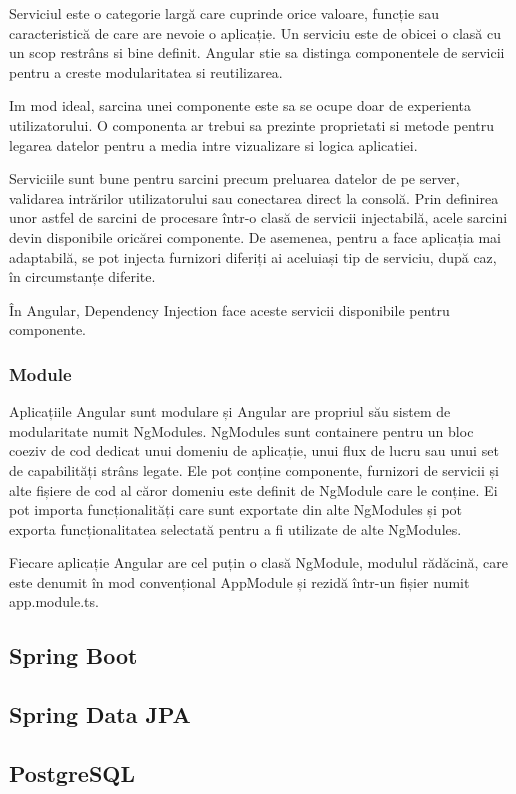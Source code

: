 \documentclass[a4paper,12pt]{article}
\begin{document}
    Serviciul este o categorie largă care cuprinde orice valoare, funcție sau caracteristică de care are nevoie o aplicație. 
    Un serviciu este de obicei o clasă cu un scop restrâns si bine definit. Angular stie sa distinga componentele de servicii pentru a creste modularitatea si reutilizarea.

    Im mod ideal, sarcina unei componente este sa se ocupe doar de experienta utilizatorului. O componenta ar trebui sa prezinte proprietati si metode
    pentru legarea datelor pentru a media intre vizualizare si logica aplicatiei.

    Serviciile sunt bune pentru sarcini precum preluarea datelor de pe server, validarea intrărilor utilizatorului sau conectarea direct la consolă. Prin definirea unor
    astfel de sarcini de procesare într-o clasă de servicii injectabilă, acele sarcini devin disponibile oricărei componente. De asemenea, pentru a face aplicația mai 
    adaptabilă, se pot injecta furnizori diferiți ai aceluiași tip de serviciu, după caz, în circumstanțe diferite.

    În Angular, Dependency Injection face aceste servicii disponibile pentru componente.

    \subsubsection{Module}
    Aplicațiile Angular sunt modulare și Angular are propriul său sistem de modularitate numit NgModules. NgModules sunt containere pentru un bloc coeziv de 
    cod dedicat unui domeniu de aplicație, unui flux de lucru sau unui set de capabilități strâns legate. Ele pot conține componente, furnizori de servicii și 
    alte fișiere de cod al căror domeniu este definit de NgModule care le conține. Ei pot importa funcționalități care sunt exportate din alte NgModules și pot 
    exporta funcționalitatea selectată pentru a fi utilizate de alte NgModules.

    Fiecare aplicație Angular are cel puțin o clasă NgModule, modulul rădăcină, care este denumit în mod convențional AppModule și rezidă într-un fișier numit app.module.ts. 
    \subsection{Spring Boot}
    \subsection{Spring Data JPA}
    \subsection{PostgreSQL}
    
\end{document}
